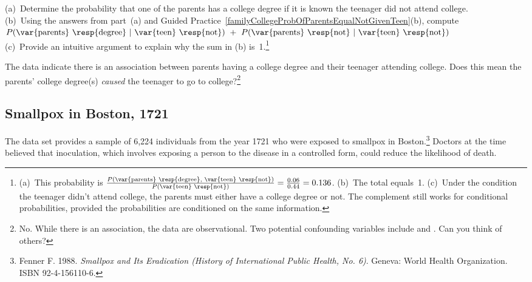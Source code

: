 \textC{\pagebreak}

\begin{exercise}\label{whyCondProbSumTo1}
(a)~Determine the probability that one of the parents has a college degree if it is known the teenager did not attend college. \\[1mm]
(b)~Using the answers from part~(a) and Guided Practice~\ref{familyCollegeProbOfParentsEqualNotGivenTeen}(b), compute\\[1mm]
$P(\text{\var{parents} \resp{degree}}\ |\ \text{\var{teen} \resp{not}})
\ + \ P(\text{\var{parents} \resp{not}}\ |\ \text{\var{teen} \resp{not}})$\\[1mm]
(c)~Provide an intuitive argument to explain why the sum in (b) is~1.\footnote{(a)~This probability is $\frac{P(\text{\var{parents} \resp{degree}, \var{teen} \resp{not}})}{P(\text{\var{teen} \resp{not}})} = \frac{0.06}{0.44} = 0.136$. (b)~The total equals~1. (c)~Under the condition the teenager didn't attend college, the parents must either have a college degree or not. The complement still works for conditional probabilities, provided the probabilities are conditioned on the same information.}
\end{exercise}

\begin{exercise}
The data indicate there is an association between parents having a college degree and their teenager attending college. Does this mean the parents' college degree(s) \emph{caused} the teenager to go to college?\footnote{No. While there is an association, the data are observational. Two potential confounding variables include  and . Can you think of others?}
\end{exercise}


\subsection{Smallpox in Boston, 1721}


The  data set provides a sample of 6,224 individuals from the year 1721 who were exposed to smallpox in Boston.\footnote{Fenner F. 1988. \emph{Smallpox and Its Eradication (History of International Public Health, No. 6)}. Geneva: World Health Organization. ISBN 92-4-156110-6.} Doctors at the time believed that inoculation, which involves exposing a person to the disease in a controlled form, could reduce the likelihood of death.

